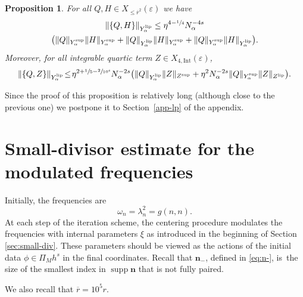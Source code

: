 \documentclass[JEP,XML,SOM,Unicode,published]{cedram}
\theoremstyle{plain}
\newtheorem{proposition}[theorem]{Proposition}
\theoremstyle{definition}
\DeclareMathOperator{\supp}{supp}
\newcommand{\nb}{{\boldsymbol n}}
\newcommand{\1}{\mathbf{1}}
\newcommand{\Ysup}[1]{Y_{#1}^{\mathrm{sup}}}
\newcommand{\Ylip}[1]{Y_{#1}^{\mathrm{lip}}}
\let\epsilon\varepsilon
\begin{document}
\begin{proposition}\label{prop:bracket1} For all $Q,H\in X_{\leq\overline{r}^{2}}(\epsilon)$ we have
\begin{multline}
\label{eq:braket1-alpha}
\|\{Q,H\}\|_{\Ylip{\alpha}}
\leq
\eta^{4-\sfrac{1}{4}}N_{\alpha}^{-4s}\\
\big(
\|Q\|_{\Ysup{\alpha}}
\|H\|_{\Ysup{\alpha}}
+
\|Q\|_{\Ylip{\alpha}}
\|H\|_{\Ysup{\alpha}}
+
\|Q\|_{\Ysup{\alpha}}
\|H\|_{\Ylip{\alpha}}
\big).
\end{multline}
Moreover, for all integrable quartic term $Z\in X_{4,\mathrm{Int}}(\epsilon)$,
\begin{equation}
\label{eq:braket1-alpha-Z}
\|\{Q,Z\}\|_{\Ylip{\alpha}}
\!\leq\!
\eta^{2+\sfrac{1}{5}-\sfrac{2}{10^{4}}}
N_{\alpha}^{-2s}
\big(
\|Q\|_{\Ylip{\alpha}}
\|Z\|_{Z^{\mathrm{sup}}}
+
\eta^{2}N_{\alpha}^{-2s}
\|Q\|_{\Ysup{\alpha}}
\|Z\|_{Z^{\mathrm{lip}}}
\big).
\end{equation}
\end{proposition}

Since the proof of this proposition is relatively long (although close to the previous one) we postpone it to Section~\ref{app-lp} of the appendix.

\section{Small-divisor estimate for the modulated frequencies}\label{sec:smd}
Initially, the frequencies are
\[
\omega_n = \lambda_n^2=g(n,n).
\]
At each step of the iteration scheme, the centering procedure modulates the frequencies with internal parameters $\xi$ as introduced in the beginning of Section \ref{sec:small-div}. These parameters should be viewed as the actions of the initial data $\phi\in\Pi_{M}h^{s}$ in the final coordinates. Recall that $\nb_{-}$, defined in \eqref{eq:n-}, is~the size of the smallest index in $\supp\nb$ that is not fully paired.

We also recall that $\overline{r}=10^{5}r$.
\end{document}
